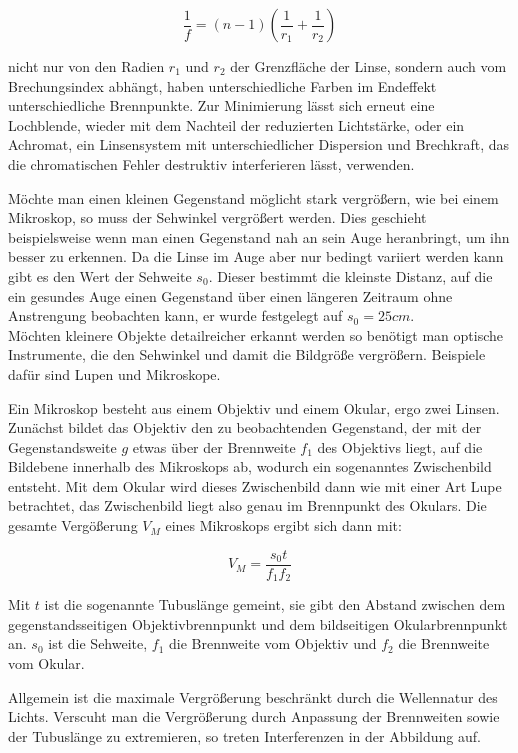 \documentclass{article}
\begin{document}
\begin{equation}
    \frac{1}{f} = (n-1) \left( \frac{1}{r_1} + \frac{1}{r_2} \right)
\end{equation}

nicht nur von den Radien $r_1$ und $r_2$ der Grenzfläche der Linse, sondern auch vom Brechungsindex abhängt, haben unterschiedliche Farben im Endeffekt unterschiedliche Brennpunkte. Zur Minimierung lässt sich erneut eine Lochblende, wieder mit dem Nachteil der reduzierten Lichtstärke, oder ein Achromat, ein Linsensystem mit unterschiedlicher Dispersion und Brechkraft, das die chromatischen Fehler destruktiv interferieren lässt, verwenden.

Möchte man einen kleinen Gegenstand möglicht stark vergrößern, wie bei einem Mikroskop, so muss der Sehwinkel vergrößert werden. Dies geschieht beispielsweise wenn man einen Gegenstand nah an sein Auge heranbringt, um ihn besser zu erkennen. Da die Linse im Auge aber nur bedingt variiert werden kann gibt es den Wert der Sehweite $s_0$. Dieser bestimmt die kleinste Distanz, auf die ein gesundes Auge einen Gegenstand über einen längeren Zeitraum ohne Anstrengung beobachten kann, er wurde festgelegt auf $s_0 = 25cm$. \\ Möchten kleinere Objekte detailreicher erkannt werden so benötigt man optische Instrumente, die den Sehwinkel und damit die Bildgröße vergrößern. Beispiele dafür sind Lupen und Mikroskope.

Ein Mikroskop besteht aus einem Objektiv und einem Okular, ergo zwei Linsen. Zunächst bildet das Objektiv den zu beobachtenden Gegenstand, der mit der Gegenstandsweite $g$ etwas über der Brennweite $f_1$ des Objektivs liegt, auf die Bildebene innerhalb des Mikroskops ab, wodurch ein sogenanntes Zwischenbild entsteht. Mit dem Okular wird dieses Zwischenbild dann wie mit einer Art Lupe betrachtet, das Zwischenbild liegt also genau im Brennpunkt des Okulars. Die gesamte Vergößerung $V_M$ eines Mikroskops ergibt sich dann mit:

\begin{equation}
    V_M = \frac{s_0 t}{f_1 f_2}
\end{equation}

Mit $t$ ist die sogenannte Tubuslänge gemeint, sie gibt den Abstand zwischen dem gegenstandsseitigen Objektivbrennpunkt und dem bildseitigen Okularbrennpunkt an. $s_0$ ist die Sehweite, $f_1$ die Brennweite vom Objektiv und $f_2$ die Brennweite vom Okular.

Allgemein ist die maximale Vergrößerung beschränkt durch die Wellennatur des Lichts. Verscuht man die Vergrößerung durch Anpassung der Brennweiten sowie der Tubuslänge zu extremieren, so treten Interferenzen in der Abbildung auf.
\end{document}
